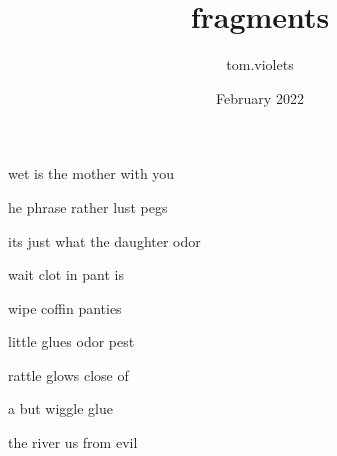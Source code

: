 \documentclass{article}
\title{fragments}
\author{tom.violets}
\date{February 2022}
\begin{document}
wet is the mother with you

he phrase rather lust pegs

its just what the daughter odor

wait clot in pant is

wipe coffin panties

little glues odor pest

rattle glows close of

a but wiggle glue

the river us from evil
\end{document}

